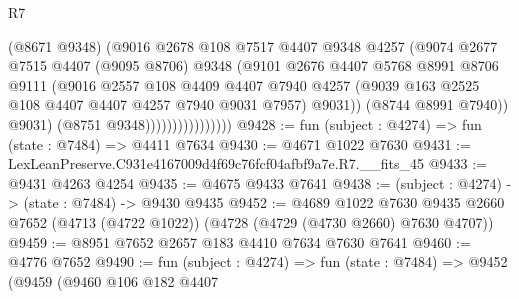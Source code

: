 \begin{lexlean}{R7}
\begin{coremodule}
                                  (@8671 @9348)
                                  (@9016
                                    @2678
                                    @108
                                    @7517
                                    @4407
                                    @9348
                                    @4257
                                    (@9074
                                      @2677
                                      @7515
                                      @4407
                                      (@9095 @8706)
                                      @9348
                                      (@9101
                                        @2676
                                        @4407
                                        @5768
                                        @8991
                                        @8706
                                        @9111
                                        (@9016
                                          @2557
                                          @108
                                          @4409
                                          @4407
                                          @7940
                                          @4257
                                          (@9039
                                            @163
                                            @2525
                                            @108
                                            @4407
                                            @4407
                                            @4257
                                            @7940
                                            @9031
                                            @7957)
                                          @9031))
                                      (@8744 @8991 @7940))
                                    @9031)
                                  (@8751 @9348))))))))))))))))
@9428 := fun (subject : @4274) => fun (state : @7484) => @4411 @7634
@9430 := @4671 @1022 @7630
@9431 := LexLeanPreserve.C931e4167009d4f69c76fcf04afbf9a7e.R7.__fits_45
@9433 := @9431 @4263 @4254
@9435 := @4675 @9433 @7641
@9438 := (subject : @4274) -> (state : @7484) -> @9430 @9435
@9452 := @4689
    @1022
    @7630
    @9435
    @2660
    @7652
    (@4713 (@4722 @1022))
    (@4728 (@4729 (@4730 @2660) @7630 @4707))
@9459 := @8951 @7652 @2657 @183 @4410 @7634 @7630 @7641
@9460 := @4776 @7652
@9490 := fun (subject : @4274) =>
  fun (state : @7484) =>
  @9452
    (@9459
      (@9460
        @106
        @182
        @4407

\end{coremodule}
\end{lexlean}
